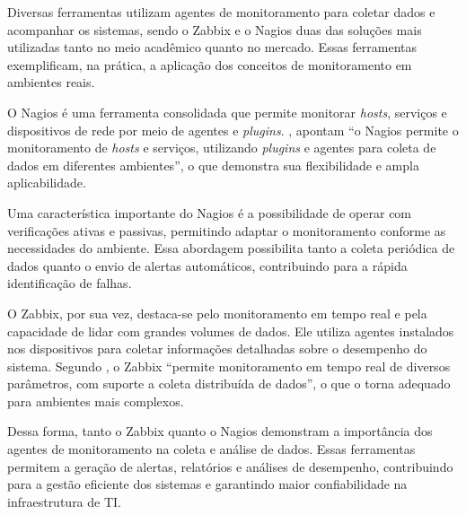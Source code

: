 \documentclass[
    12pt
    ,oneside
    ,a4paper
    ,chapter=TITLE
    ,section=TITLE
    ,sumario=abnt-6027-2012]{abntex2}
\begin{document}
Diversas ferramentas utilizam agentes de monitoramento para coletar dados e acompanhar os sistemas, sendo o Zabbix e o Nagios duas das soluções mais utilizadas tanto no meio acadêmico quanto no mercado. Essas ferramentas exemplificam, na prática, a aplicação dos conceitos de monitoramento em ambientes reais.

O Nagios é uma ferramenta consolidada que permite monitorar \textit{hosts}, serviços e dispositivos de rede por meio de agentes e \textit{plugins}. , apontam “o Nagios permite o monitoramento de \textit{hosts} e serviços, utilizando \textit{plugins} e agentes para coleta de dados em diferentes ambientes”, o que demonstra sua flexibilidade e ampla aplicabilidade.

Uma característica importante do Nagios é a possibilidade de operar com verificações ativas e passivas, permitindo adaptar o monitoramento conforme as necessidades do ambiente. Essa abordagem possibilita tanto a coleta periódica de dados quanto o envio de alertas automáticos, contribuindo para a rápida identificação de falhas.

O Zabbix, por sua vez, destaca-se pelo monitoramento em tempo real e pela capacidade de lidar com grandes volumes de dados. Ele utiliza agentes instalados nos dispositivos para coletar informações detalhadas sobre o desempenho do sistema. Segundo , o Zabbix “permite monitoramento em tempo real de diversos parâmetros, com suporte a coleta distribuída de dados”, o que o torna adequado para ambientes mais complexos.

Dessa forma, tanto o Zabbix quanto o Nagios demonstram a importância dos agentes de monitoramento na coleta e análise de dados. Essas ferramentas permitem a geração de alertas, relatórios e análises de desempenho, contribuindo para a gestão eficiente dos sistemas e garantindo maior confiabilidade na infraestrutura de TI.


\end{document}
